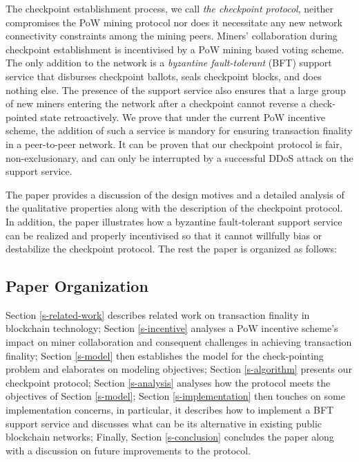 The checkpoint establishment process, we call \textit{the checkpoint protocol}, neither compromises the PoW mining protocol nor does it necessitate any new network connectivity constraints among the mining peers. Miners' collaboration during checkpoint establishment is incentivised by a PoW mining based voting scheme. The only addition to the network is a \textit{byzantine fault-tolerant} (BFT) \cite{Lamport:1982:BGP:357172.357176} support service that disburses checkpoint ballots, seals checkpoint blocks, and does nothing else. The presence of the support service also ensures that a large group of new miners entering the network after a checkpoint cannot reverse a check-pointed state retroactively. We prove that under the current PoW incentive scheme, the addition of such a service is mandory for ensuring transaction finality in a peer-to-peer network. It can be proven that our checkpoint protocol is fair, non-exclusionary, and can only be interrupted by a successful DDoS attack \cite{Yu:2013:DDS:2556385} on the support service.          

The paper provides a discussion of the design motives and a detailed analysis of the qualitative properties along with the description of the checkpoint protocol. In addition, the paper illustrates how a byzantine fault-tolerant support service can be realized and properly incentivised so that it cannot willfully bias or destabilize the checkpoint protocol. The rest the paper is organized as follows:

\subsection{Paper Organization}
Section \ref{s-related-work} describes related work on transaction finality in blockchain technology; Section \ref{s-incentive} analyses a PoW incentive scheme's impact on miner collaboration and consequent challenges in achieving transaction finality; Section \ref{s-model} then establishes the model for the check-pointing problem and elaborates on modeling objectives; Section \ref{s-algorithm} presents our checkpoint protocol; Section \ref{s-analysis} analyses how the protocol meets the objectives of Section \ref{s-model}; Section \ref{s-implementation} then touches on some implementation concerns, in particular, it describes how to implement a BFT support service and discusses what can be its alternative in existing public blockchain networks; Finally, Section \ref{s-conclusion} concludes the paper along with a discussion on future improvements to the protocol.  
